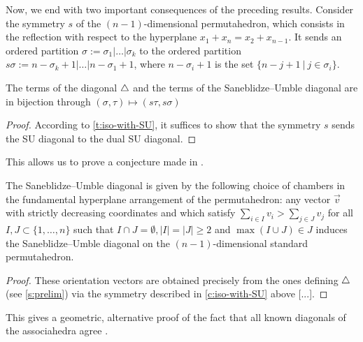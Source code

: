 Now, we end with two important consequences of the preceding results. 
Consider the symmetry $s$ of the $(n-1)$-dimensional permutahedron, which consists in the reflection with respect to the hyperplane $x_1 + x_n = x_2 + x_{n-1}$. 
It sends an ordered partition $\sigma:=\sigma_1 | \ldots | \sigma_k$ to the ordered partition $s\sigma:=n-\sigma_{k}+1 | \ldots | n-\sigma_{1}+1$, where $n-\sigma_i+1$ is the set $\{n-j+1 \ | \ j \in \sigma_i\}$. 
\begin{corollary}
\label{c:iso-with-SU}
The terms of the diagonal $\triangle$ and the terms of the Saneblidze--Umble diagonal are in bijection through $(\sigma,\tau) \mapsto (s\tau,s\sigma)$
\end{corollary}

\begin{proof}
According to \cref{t:iso-with-SU}, it suffices to show that the symmetry $s$ sends the SU diagonal to the dual SU diagonal. 
\end{proof}

This allows us to prove a conjecture made in \cite[Remark 3.19]{LA21}.

\begin{corollary} \label{SU from hyperplane arrangement}
    The Saneblidze--Umble diagonal is given by the following choice of chambers in the fundamental hyperplane arrangement of the permutahedron: any vector $\vec v$ with strictly decreasing coordinates and which satisfy $\sum_{i \in I} v_i > \sum_{j \in J} v_j$ for all $I,J \subset \{1, \ldots, n\}$ such that $I \cap J = \emptyset, |I|=|J| \geq 2$ and $\max(I \cup J) \in J$ induces the Saneblidze--Umble diagonal on the $(n-1)$-dimensional standard permutahedron. 
\end{corollary}

\begin{proof}
    These orientation vectors are obtained precisely from the ones defining $\triangle$ (see \cref{s:prelim}) via the symmetry described in \cref{c:iso-with-SU} above [...]. 
\end{proof}

This gives a geometric, alternative proof of the fact that all known diagonals of the associahedra agree \cite{saneblidzeComparingDiagonalsAssociahedra2022}.



